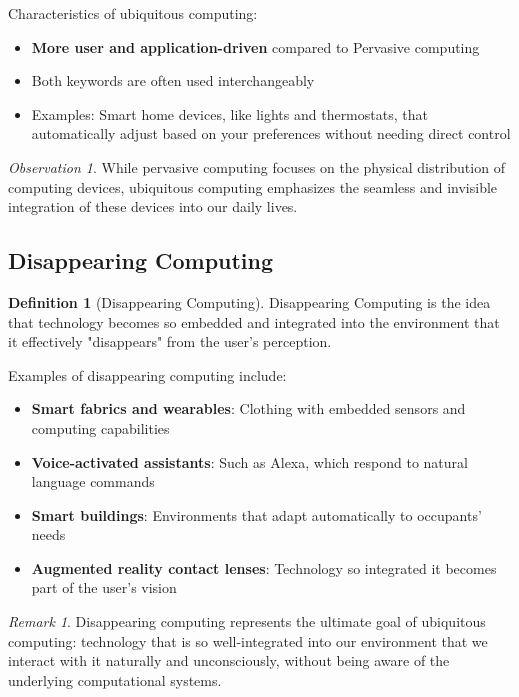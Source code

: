 \documentclass[11pt,a4paper]{article}
\theoremstyle{definition}
\newtheorem{definition}{Definition}[section]
\theoremstyle{plain}
\theoremstyle{remark}
\newtheorem*{remark}{Remark}
\newtheorem*{observation}{Observation}
\begin{document}
Characteristics of ubiquitous computing:

\begin{itemize}
    \item \textbf{More user and application-driven} compared to Pervasive computing
    \item Both keywords are often used interchangeably
    \item Examples: Smart home devices, like lights and thermostats, that automatically adjust based on your preferences without needing direct control
\end{itemize}

\begin{observation}
While pervasive computing focuses on the physical distribution of computing devices, ubiquitous computing emphasizes the seamless and invisible integration of these devices into our daily lives.
\end{observation}

\subsection{Disappearing Computing}

\begin{definition}[Disappearing Computing]
Disappearing Computing is the idea that technology becomes so embedded and integrated into the environment that it effectively "disappears" from the user's perception.
\end{definition}

Examples of disappearing computing include:

\begin{itemize}
    \item \textbf{Smart fabrics and wearables}: Clothing with embedded sensors and computing capabilities
    \item \textbf{Voice-activated assistants}: Such as Alexa, which respond to natural language commands
    \item \textbf{Smart buildings}: Environments that adapt automatically to occupants' needs
    \item \textbf{Augmented reality contact lenses}: Technology so integrated it becomes part of the user's vision
\end{itemize}

\begin{remark}
Disappearing computing represents the ultimate goal of ubiquitous computing: technology that is so well-integrated into our environment that we interact with it naturally and unconsciously, without being aware of the underlying computational systems.
\end{remark}
\end{document}
